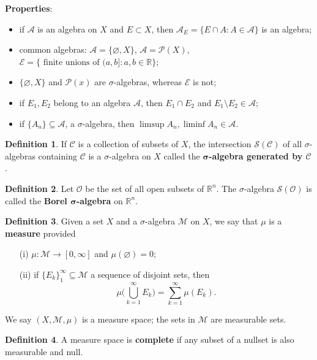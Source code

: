 \documentclass[11pt]{amsart}
\theoremstyle{definition}
\newtheorem*{definition*}{Definition}
\renewcommand\emptyset{\varnothing}
\renewcommand\:{\colon}
\newcommand{\calA}{\mathcal{A}}
\newcommand{\calC}{\mathcal{C}}
\newcommand{\calE}{\mathcal{E}}
\newcommand{\calM}{\mathcal{M}}
\newcommand{\calO}{\mathcal{O}}
\newcommand{\calP}{\mathcal{P}}
\newcommand{\calS}{\mathcal{S}}
\newcommand{\R}{\mathds{R}}
\begin{document}
\noindent \textbf{Properties}:
\begin{itemize}[leftmargin=15pt]\setlength\itemsep{0em}
	\item if $\calA$ is an algebra on $X$ and $E \subset X$, then $\calA_E = \{E \cap A : A \in \calA\}$ is an algebra;
	\item common algebras: $\calA = \{\emptyset, X\}$, $\calA = \calP(X)$, $\calE = \{ \text{ finite unions of } (a, b] : a, b \in \R\}$;
	\item $\{\emptyset, X\}$ and $\calP(x)$ are $\sigma$-algebras, whereas $\calE$ is not;
	\item if $E_1, E_2$ belong to an algebra $\calA$, then $E_1 \cap E_2$ and $E_1 \setminus E_2 \in \calA$;
	\item if $\{A_n\} \subseteq \calA$, a $\sigma$-algebra, then $\limsup A_n, \liminf A_n \in \calA$.
\end{itemize}

\begin{definition*}
	If $\calC$ is a collection of subsets of $X$, the intersection $\calS(\calC)$ of all $\sigma$-algebras containing $\calC$ is a $\sigma$-algebra on $X$ called the \textbf{$\boldsymbol{\sigma}$-algebra generated by $\boldsymbol{\calC}$}. 
\end{definition*}

\begin{definition*}
	Let $\calO$ be the set of all open subsets of $\R^n$. The $\sigma$-algebra $\calS(\calO)$ is called the \textbf{Borel $\boldsymbol{\sigma}$-algebra} on $\R^n$.
\end{definition*}

\begin{definition*}
	Given a set $X$ and a $\sigma$-algebra $\calM$ on $X$, we say that $\mu$ is a \textbf{measure} provided
	\begin{itemize}[leftmargin=22.5pt]\setlength\itemsep{0em}
		\item[\textnormal{(i)}] $\mu\: \calM \to [0, \infty]$ and $\mu(\emptyset) = 0$;
		\item[\textnormal{(ii)}] if $\{E_k\}_1^\infty \subseteq \calM$ a sequence of disjoint sets, then 
			\[ \mu\bigg( \bigcup_{k=1}^\infty E_k \bigg) = \sum_{k=1}^\infty \mu(E_k). \]
	\end{itemize}
	We say $(X, \calM, \mu)$ is a measure space; the sets in $\calM$ are measurable sets.
\end{definition*}

\begin{definition*}
	A measure space is \textbf{complete} if any subset of a nullset is also measurable and null.
\end{definition*}
\end{document}
